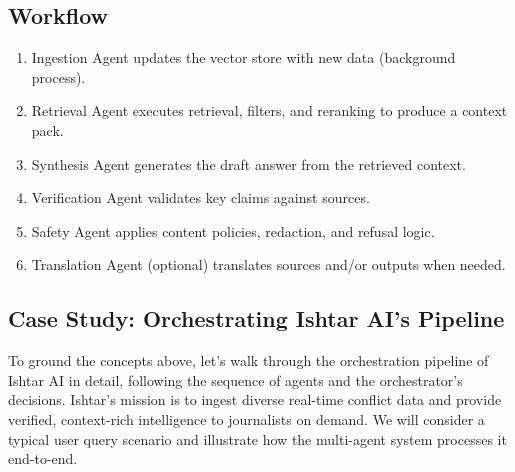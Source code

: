 \subsection{Workflow}
\begin{enumerate}
    \item Ingestion Agent updates the vector store with new data (background process).
    \item Retrieval Agent executes retrieval, filters, and reranking to produce a context pack.
    \item Synthesis Agent generates the draft answer from the retrieved context.
    \item Verification Agent validates key claims against sources.
    \item Safety Agent applies content policies, redaction, and refusal logic.
    \item Translation Agent (optional) translates sources and/or outputs when needed.
\end{enumerate}

\subsection*{Case Study: Orchestrating Ishtar AI's Pipeline}
To ground the concepts above, let's walk through the orchestration pipeline of Ishtar AI in detail, following the sequence of agents and the orchestrator's decisions. Ishtar's mission is to ingest diverse real-time conflict data and provide verified, context-rich intelligence to journalists on demand. We will consider a typical user query scenario and illustrate how the multi-agent system processes it end-to-end.

